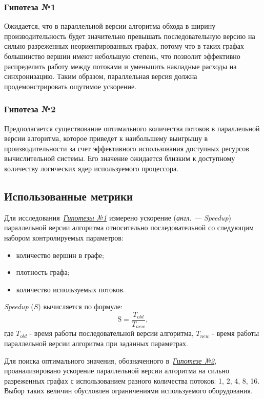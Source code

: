 \subsubsection*{Гипотеза №1}
\label{t1}
\noindent Ожидается, что в параллельной версии алгоритма обхода в ширину производительность будет значительно превышать последовательную версию на сильно разреженных неориентированных графах, потому что в таких графах большинство вершин имеют небольшую степень, что позволит эффективно распределить работу между потоками и уменьшить накладные расходы на синхронизацию. Таким образом, параллельная версия должна продемонстрировать ощутимое ускорение.

\subsubsection*{Гипотеза №2}
\label{t2}
\noindent Предполагается существование оптимального количества потоков в параллельной версии алгоритма, которое приведет к наибольшему выигрышу в производительности за счет эффективного использования доступных ресурсов вычислительной системы. Его значение ожидается близким к доступному количеству логических ядер используемого процессора.



\subsection{Использованные метрики}
\noindent Для исследования~\hyperref[t1]{\textit{Гипотезы №1}} измерено ускорение (\textit{англ. --- Speedup}) параллельной версии алгоритма относительно последовательной со следующим набором контролируемых параметров:
\begin{itemize}
    \item количество вершин в графе;
    \item плотность графа;
    \item количество используемых потоков.
\end{itemize}
\textit{Speedup} ($S$) вычисляется по формуле:
\begin{equation}
\label{eq:speedup}
	\text{S} = \frac{T_{old}}{T_{new}},
\end{equation}
где $T_{old}$ - время работы последовательной версии алгоритма, $T_{new}$ - время работы параллельной версии алгоритма при заданных параметрах.

Для поиска оптимального значения, обозначенного в~\hyperref[t2]{\textit{Гипотезе №2}}, проанализировано ускорение параллельной версии алгоритма на сильно разреженных графах с использованием разного количества потоков: 1, 2, 4, 8, 16. Выбор таких величин обусловлен ограничениями используемого оборудования.



